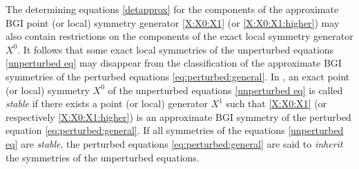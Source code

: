 \documentclass[11pt,letter,subeqn]{article}
\begin{document}
The determining equations \eqref{detapprox} for the components of the approximate BGI point (or local) symmetry generator \eqref{X:X0:X1} (or  \eqref{X:X0:X1:higher}) may also contain restrictions on the components of the exact local symmetry generator $X^0$. It follows that some exact local symmetries of the unperturbed equations \eqref{unperturbed eq} may disappear from the classification of the approximate BGI symmetries of the perturbed equations \eqref{eq:perturbed:general}. In \cite{ibragimov1995crc}, an exact point (or local) symmetry $X^0$ of the unperturbed equations \eqref{unperturbed eq}  is called \textit{\textrm{stable}} if there exists a point (or local) generator $X^{1}$ such that
\eqref{X:X0:X1} (or respectively \eqref{X:X0:X1:higher}) is an approximate BGI symmetry of the perturbed equation \eqref{eq:perturbed:general}.  If all symmetries of the equations \eqref{unperturbed eq}  are \emph{stable}, the perturbed equations \eqref{eq:perturbed:general} are said to \emph{inherit} the symmetries of the unperturbed equations.
\end{document}
